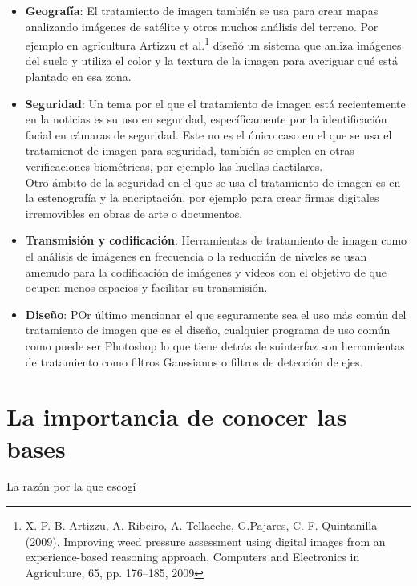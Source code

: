 \documentclass[a4paper,12pt]{report}
\begin{document}
\begin{itemize}
\item \textbf{Geografía}: El tratamiento de imagen también se usa para crear mapas analizando imágenes de satélite y otros muchos análisis del terreno. Por ejemplo en agricultura Artizzu et al.\footnote{X. P. B. Artizzu, A. Ribeiro, A. Tellaeche, G.Pajares, C. F. Quintanilla (2009), Improving weed pressure assessment using digital images from an experience-based reasoning approach, Computers and Electronics in Agriculture, 65, pp. 176–185,
2009} diseñó un sistema que anliza imágenes del suelo y utiliza el color y la textura de la imagen para averiguar qué está plantado en esa zona.
\item \textbf{Seguridad}: Un tema por el que el tratamiento de imagen está recientemente en la noticias es su uso en seguridad, específicamente por la identificación facial en cámaras de seguridad. Este no es el único caso en el que se usa el tratamienot de imagen para seguridad, también se emplea en otras verificaciones biométricas, por ejemplo las huellas dactilares.\\

Otro ámbito de la seguridad en el que se usa el tratamiento de imagen es en la estenografía y la encriptación, por ejemplo para crear firmas digitales irremovibles en obras de arte o documentos.\\

\item \textbf{Transmisión y codificación}: Herramientas de tratamiento de imagen como el análisis de imágenes en frecuencia o  la reducción de niveles se usan amenudo para la codificación de imágenes y videos con el objetivo de que ocupen menos espacios y facilitar su transmisión.\\

\item \textbf{Diseño}: POr último mencionar el que seguramente sea el uso más común del tratamiento de imagen que es el diseño, cualquier programa de uso común como puede ser Photoshop lo que tiene detrás de suinterfaz son herramientas de tratamiento como filtros Gaussianos o filtros de detección de ejes.\\

\end{itemize}


\section{La importancia de conocer las bases}

La razón por la que escogí 
\end{document}
